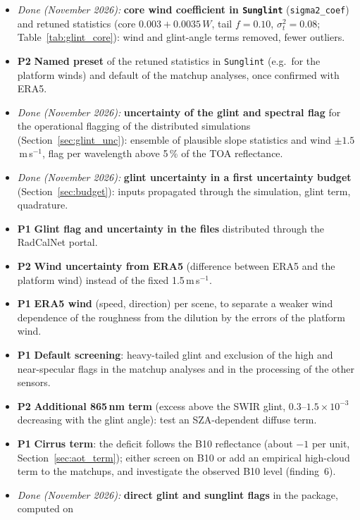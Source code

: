 \documentclass[11pt,a4paper]{article}
\newcommand{\code}[1]{\texttt{#1}}
\newcommand{\prio}[1]{\textbf{\textcolor{blue!50!black}{#1}}}
\begin{document}
\begin{itemize}
  (Section~\ref{sec:glint_wind}): in the core, not in the tail; core $0.003 + 0.0035\,W$ with the tail
  ($f=0.05$, $\sigma_t^2=0.08$--0.12) removes the wind term beyond $30^\circ$.
\item \textit{Done (November 2026):} \textbf{core wind coefficient in \code{Sunglint}} (\code{sigma2\_coef}) and
  retuned statistics (core $0.003 + 0.0035\,W$, tail $f=0.10$, $\sigma_t^2=0.08$; Table~\ref{tab:glint_core}): wind
  and glint-angle terms removed, fewer outliers.
\item \prio{P2} \textbf{Named preset} of the retuned statistics in \code{Sunglint} (e.g.\ for the platform winds) and
  default of the matchup analyses, once confirmed with ERA5.
\item \textit{Done (November 2026):} \textbf{uncertainty of the glint and spectral flag} for the operational flagging
  of the distributed simulations (Section~\ref{sec:glint_unc}): ensemble of plausible slope statistics and wind
  $\pm1.5$\,m\,s$^{-1}$, flag per wavelength above 5\,\% of the TOA reflectance.
\item \textit{Done (November 2026):} \textbf{glint uncertainty in a first uncertainty budget}
  (Section~\ref{sec:budget}): inputs propagated through the simulation, glint term, quadrature.
\item \prio{P1} \textbf{Glint flag and uncertainty in the files} distributed through the RadCalNet portal.
\item \prio{P2} \textbf{Wind uncertainty from ERA5} (difference between ERA5 and the platform wind) instead of the
  fixed 1.5\,m\,s$^{-1}$.
\item \prio{P1} \textbf{ERA5 wind} (speed, direction) per scene, to separate a weaker wind dependence of the
  roughness from the dilution by the errors of the platform wind.
\item \prio{P1} \textbf{Default screening}: heavy-tailed glint and exclusion of the high and near-specular flags in
  the matchup analyses and in the processing of the other sensors.
\item \prio{P2} \textbf{Additional 865\,nm term} (excess above the SWIR glint, 0.3--$1.5\times10^{-3}$ decreasing
  with the glint angle): test an SZA-dependent diffuse term.
\item \prio{P1} \textbf{Cirrus term}: the deficit follows the B10 reflectance (about $-1$ per unit,
  Section~\ref{sec:aot_term}); either screen on B10 or add an empirical high-cloud term to the matchups, and
  investigate the observed B10 level (finding~6).
\item \textit{Done (November 2026):} \textbf{direct glint and sunglint flags} in the package, computed on

\end{itemize}
\end{document}
